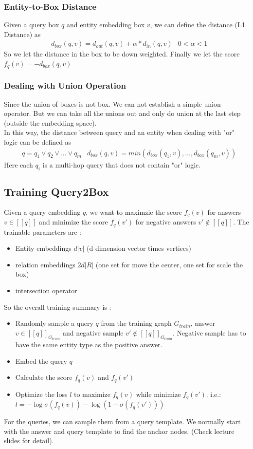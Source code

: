 \subsubsection{Entity-to-Box Distance} 
Given a query box $q$ and entity embedding box $v$, we can define the distance (L1 Distance) as 
    \begin{align*}
        & d_{box}(q,v) = d_{out}(q,v) + \alpha * d_{in}(q,v) & 0 < \alpha < 1
    \end{align*}
So we let the distance in the box to be down weighted. Finally we let the score $f_q(v) = -d_{box}(q,v)$

\subsubsection{Dealing with Union Operation} 
Since the union of boxes is not box. We can not establish a simple union operator. But we can take all the unions out and only do union at the last step (outside the embedding space). \\

In this way, the distance between query and an entity when dealing with "or" logic can be defined as 
    \begin{align*}
        & q = q_1 \vee q_2 \vee ... \vee q_m 
        & d_{box}(q,v) = min(d_{box}(q_1,v), ..., d_{box}(q_m,v))
    \end{align*}
Here each $q_i$ is a multi-hop query that does not contain "or" logic. 


\subsection{Training Query2Box}
Given a query embedding $q$, we want to maximzie the score $f_q(v)$ for answers $v \in [[q]]$ and minimize the score $f_q(v')$ for negative answers $v' \notin [[q]]$. The trainable parameters are : 
    \begin{itemize}
        \item Entity embeddings $d|v|$ (d dimension vector times vertiecs)
        \item relation embeddings $2d|R|$ (one set for move the center, one set for scale the box) 
        \item intersection operator 
    \end{itemize}
So the overall training summary is : 
    \begin{itemize}
        \item Randomly sample a query $q$ from the training graph $G_{train}$, answer $v\in [[q]]_{G_{train}}$ and negative sample $v' \notin [[q]]_{G_{train}}$. Negative sample has to have the same entity type as the positive answer. 
        \item Embed the query $q$
        \item Calculate the score $f_q(v)$ and $f_q(v')$
        \item Optimize the loss $l$ to maximize $f_q(v)$ while minimize $f_q(v')$. i.e.: $l = -\log \sigma(f_q(v)) - \log(1-\sigma(f_q(v')))$
    \end{itemize}
For the queries, we can sample them from a query template. We normally start with the answer and query template to find the anchor nodes. (Check lecture slides for detail). 